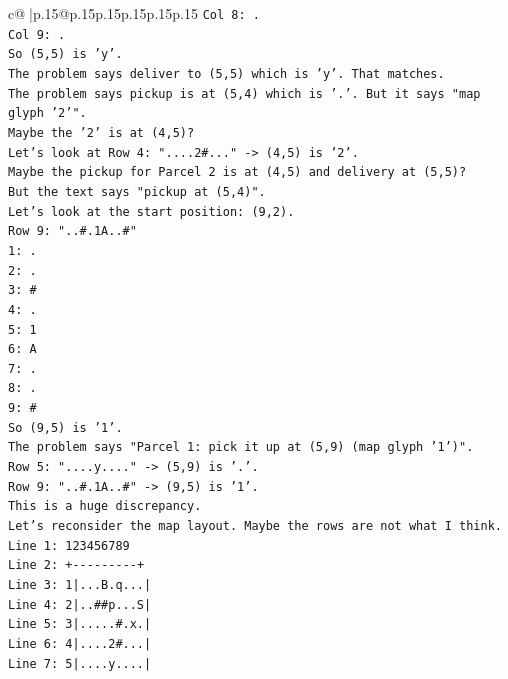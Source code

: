\documentclass{article}
\begin{document}
{\begin{supertabular}{c@{$\;$}|p{.15\linewidth}@{}p{.15\linewidth}p{.15\linewidth}p{.15\linewidth}p{.15\linewidth}p{.15\linewidth}}
{{{\texttt{Col 8: .} \\
\texttt{Col 9: .} \\
\texttt{So (5,5) is 'y'.} \\
\texttt{The problem says deliver to (5,5) which is 'y'. That matches.} \\
\texttt{The problem says pickup is at (5,4) which is '.'. But it says "map glyph '2'".} \\
\texttt{Maybe the '2' is at (4,5)?} \\
\texttt{Let's look at Row 4: "....2\#..." {-}> (4,5) is '2'.} \\
\texttt{Maybe the pickup for Parcel 2 is at (4,5) and delivery at (5,5)?} \\
\texttt{But the text says "pickup at (5,4)".} \\
\texttt{Let's look at the start position: (9,2).} \\
\texttt{Row 9: "..\#.1A..\#"} \\
\texttt{1: .} \\
\texttt{2: .} \\
\texttt{3: \#} \\
\texttt{4: .} \\
\texttt{5: 1} \\
\texttt{6: A} \\
\texttt{7: .} \\
\texttt{8: .} \\
\texttt{9: \#} \\
\texttt{So (9,5) is '1'.} \\
\texttt{The problem says "Parcel 1: pick it up at (5,9) (map glyph '1')".} \\
\texttt{Row 5: "....y...." {-}> (5,9) is '.'.} \\
\texttt{Row 9: "..\#.1A..\#" {-}> (9,5) is '1'.} \\
\texttt{This is a huge discrepancy.} \\
\texttt{Let's reconsider the map layout. Maybe the rows are not what I think.} \\
\texttt{Line 1: 123456789} \\
\texttt{Line 2: +{-}{-}{-}{-}{-}{-}{-}{-}{-}+} \\
\texttt{Line 3: 1|...B.q...|} \\
\texttt{Line 4: 2|..\#\#p...S|} \\
\texttt{Line 5: 3|.....\#.x.|} \\
\texttt{Line 6: 4|....2\#...|} \\
\texttt{Line 7: 5|....y....|} \\
}}}
\end{supertabular}}
\end{document}
